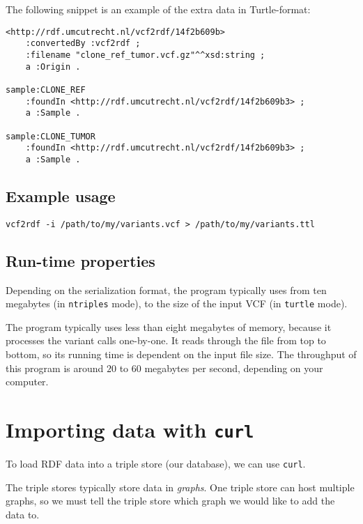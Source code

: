 \documentclass[11pt,a4paper,oneside]{book}
\begin{document}
  The following snippet is an example of the extra data in Turtle-format:

  \begin{siderules}
\begin{verbatim}
<http://rdf.umcutrecht.nl/vcf2rdf/14f2b609b>
    :convertedBy :vcf2rdf ;
    :filename "clone_ref_tumor.vcf.gz"^^xsd:string ;
    a :Origin .

sample:CLONE_REF
    :foundIn <http://rdf.umcutrecht.nl/vcf2rdf/14f2b609b3> ;
    a :Sample .

sample:CLONE_TUMOR
    :foundIn <http://rdf.umcutrecht.nl/vcf2rdf/14f2b609b3> ;
    a :Sample .
\end{verbatim}
\end{siderules}

\subsection{Example usage}

\begin{siderules}
\begin{verbatim}
vcf2rdf -i /path/to/my/variants.vcf > /path/to/my/variants.ttl
\end{verbatim}
\end{siderules}

\subsection{Run-time properties}

  Depending on the serialization format, the program typically uses from ten megabytes
  (in \texttt{ntriples} mode), to the size of the input VCF (in \texttt{turtle} mode).

  The program typically uses less than eight megabytes of memory, because it
  processes the variant calls one-by-one.  It reads through the file from top
  to bottom, so its running time is dependent on the input file size.  The
  throughput of this program is around $20$ to $60$ megabytes per second,
  depending on your computer.

\section{Importing data with \texttt{curl}}
\label{sec:curl}

  To load RDF data into a triple store (our database), we can use \texttt{curl}.

  The triple stores typically store data in \emph{graphs}.  One triple store
  can host multiple graphs, so we must tell the triple store which graph we
  would like to add the data to.
\end{document}
